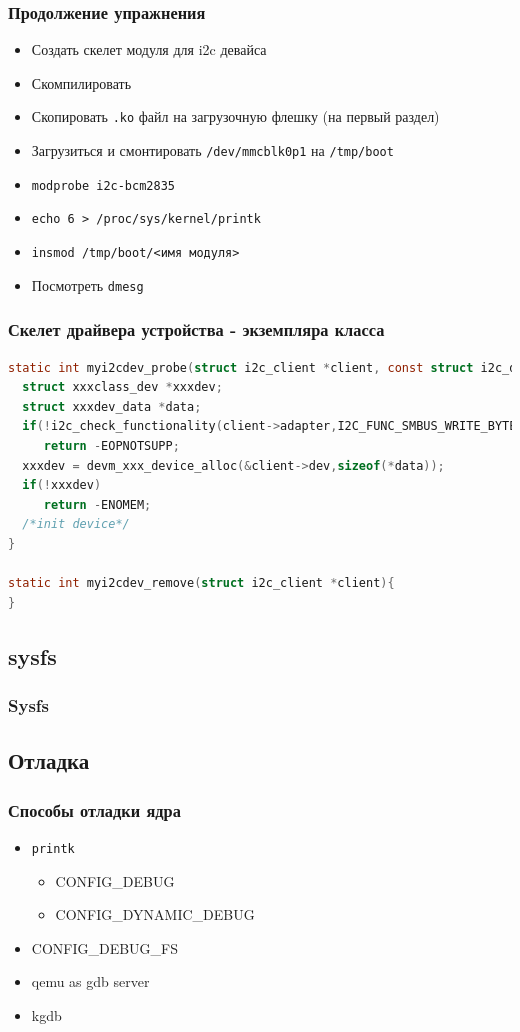 \begin{frame}[fragile]
    \frametitle{Продолжение упражнения}
    \begin{itemize}
        \item Создать скелет модуля для i2c девайса
        \item Скомпилировать
        \item Скопировать \texttt{.ko} файл на загрузочную флешку (на первый раздел)
        \item Загрузиться и смонтировать \texttt{/dev/mmcblk0p1} на \texttt{/tmp/boot}
        \item \verb+modprobe i2c-bcm2835+
        \item \verb+echo 6 > /proc/sys/kernel/printk+
        \item \verb+insmod /tmp/boot/<имя модуля>+
        \item Посмотреть \texttt{dmesg}
    \end{itemize}
\end{frame}


\begin{frame}[fragile]
  \frametitle{Скелет драйвера устройства - экземпляра класса}
\begin{lstlisting}[language=C]
static int myi2cdev_probe(struct i2c_client *client, const struct i2c_device_id *id){
  struct xxxclass_dev *xxxdev;
  struct xxxdev_data *data;
  if(!i2c_check_functionality(client->adapter,I2C_FUNC_SMBUS_WRITE_BYTE|..)
     return -EOPNOTSUPP;
  xxxdev = devm_xxx_device_alloc(&client->dev,sizeof(*data));
  if(!xxxdev)
     return -ENOMEM;
  /*init device*/
}

static int myi2cdev_remove(struct i2c_client *client){
}
\end{lstlisting}
\end{frame}

\subsection{sysfs}
\begin{frame}
  \frametitle{Sysfs}
\end{frame}
\subsection{Отладка}
\begin{frame}
  \frametitle{Способы отладки ядра}
  \begin{itemize}
    \item \texttt{printk} 
      \begin{itemize}
          \item CONFIG\_DEBUG
          \item CONFIG\_DYNAMIC\_DEBUG
      \end{itemize}
    \item CONFIG\_DEBUG\_FS
    \item qemu as gdb server
    \item kgdb
  \end{itemize}
\end{frame}

